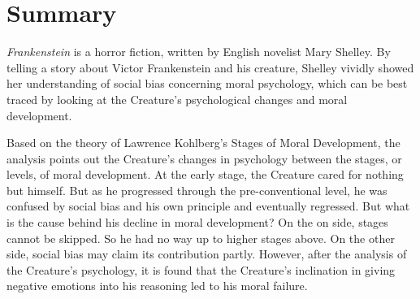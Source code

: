 \section{Summary} %
\label{sec:summary_analysis}
\begin{text}

\textit{Frankenstein} is a horror fiction, written by English novelist Mary Shelley. By telling a story about Victor Frankenstein and his creature, Shelley vividly showed her understanding of social bias concerning moral psychology, which can be best traced by looking at the Creature's psychological changes and moral development.

Based on the theory of Lawrence Kohlberg's Stages of Moral Development, the analysis points out the Creature's changes in psychology between the stages, or levels, of moral development. At the early stage, the Creature cared for nothing but himself. But as he progressed through the pre-conventional level, he was confused by social bias and his own principle and eventually regressed. But what is the cause behind his decline in moral development? On the on side, stages cannot be skipped. So he had no way up to higher stages above. On the other side, social bias may claim its contribution partly. However, after the analysis of the Creature's psychology, it is found that the Creature's inclination in giving negative emotions into his reasoning led to his moral failure.


\end{text}
